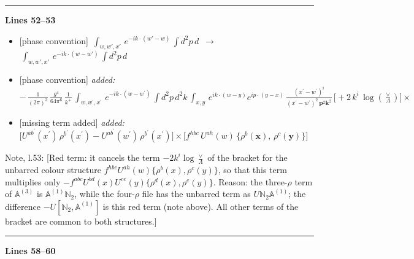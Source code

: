 \documentclass[10pt]{article}
\newenvironment{notebox}{\def\FrameCommand{{\color{notebar}\vrule width 1.5pt}\hspace{6pt}}\MakeFramed{\advance\hsize-\width\FrameRestore}\small}{\endMakeFramed}
\def\mf#1{\mathbb{#1}}
\begin{document}
\noindent\rule{\linewidth}{0.3pt}\par\noindent\textbf{Lines 52--53} \par
\begin{itemize}[leftmargin=2.2em,itemsep=1pt,topsep=2pt]
\item[\textbf{l.52}] \textsf{\small [phase convention]} $\displaystyle \,\int_{w,w',x'}\, e^{-ik\cdot (w'-w)}\,\int d^{2}p\,d$\ $\longrightarrow$\ $\displaystyle \,\int_{w,w',x'}\, e^{-ik\cdot (w-w')}\,\int d^{2}p\,d$
\item[\textbf{l.52}] \textsf{\small [phase convention]} \emph{added:} $\displaystyle -\,\frac{1}{(2\pi)^{3}}\,\frac{g^{4}}{64\pi^{6}}\, \frac{1}{k^{+}}\,\int_{w,w^{\prime},x^{\prime}}\, e^{-ik\cdot (w-w^{\prime})}\,\int d^{2}p\,d^{2}k\,\int_{x,y}\, e^{ik\cdot (w-y)} e^{ip\cdot (y-x)}\, \frac{(x^{\prime}-w^{\prime})^{i}}{(x^{\prime}-w^{\prime})^{2}\,\mathbf{p}^{2}\mathbf{k}^{2} }\,\Bigg[+2\,k^{i}\,\log{(\frac{\vee}{\Lambda})}\Bigg]\times$
\item[\textbf{l.52}] \textsf{\small [missing term added]} \emph{added:} $\displaystyle \Bigg[U^{ab^{\prime}}(x^{\prime})\,\rho^{b^{\prime}}(x^{\prime}) - U^{ab^{\prime}}(w^{\prime})\,\rho^{b^{\prime}}(x^{\prime})\Bigg]\times\Bigg[f^{hbc}\,U^{ah}(w)\,\{ \rho^{b}(\mathbf{x}),\,\rho^{c}(\mathbf{y})\}\Bigg]$
\end{itemize}
\begin{notebox}\textsf{\small Note, l.53:} [Red term: it cancels the term $-2k^{i}\log\frac{\vee}{\Lambda}$ of the bracket for the unbarred colour structure $f^{hbc}U^{ah}(w)\{\rho^{b}(x),\rho^{c}(y)\}$, so that this term multiplies only $-f^{abc}U^{bd}(x)U^{ce}(y)\{\rho^{d}(x),\rho^{e}(y)\}$. Reason: the three-$\rho$ term of $\mf{A}^{(3)}$ is $\mf{A}^{(1)}\mf{N}_{2}$, while the four-$\rho$ file has the unbarred term as $U\mf{N}_{2}\mf{A}^{(1)}$; the difference $-U[\mf{N}_{2},\mf{A}^{(1)}]$ is this red term (note above). All other terms of the bracket are common to both structures.]\end{notebox}
\noindent\rule{\linewidth}{0.3pt}\par\noindent\textbf{Lines 58--60} \par
\end{document}
